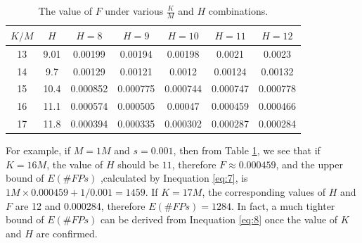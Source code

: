\documentclass[conference]{IEEEtran}
\begin{document}
\begin{table} 
	\centering
	\caption{The value of $F$ under various $\frac{K}{M}$ and $H$ combinations.}
   \begin{tabular}{|c|c|c|c|c|c|c|}
   	\hline
   	$K/M$ & $H$& $H=8$ & $H=9$ & $H=10$ & $H=11$ & $H=12$\\ 
   	\hline
   	13&9.01&0.00199&0.00194&0.00198&0.0021&0.0023\\
   	\hline
   	14&9.7&0.00129&0.00121&0.0012&0.00124&0.00132\\
   	\hline
   	15&10.4&0.000852&0.000775&0.000744&0.000747&0.000778\\
   	\hline
   	16&11.1&0.000574&0.000505&0.00047&0.000459&0.000466\\
   	\hline
   	17&11.8&0.000394&0.000335&0.000302&0.000287&0.000284\\
   	\hline
   \end{tabular}
    	\label{tab:2}
\end{table}
For example, if $M=1M$ and $s=0.001$, then from Table \ref{tab:2}, we see that if $K=16M$, the value of $H$ should be $11$, therefore $F\approx0.000459$, and the upper bound of $E(\#FPs)$ ,calculated by Inequation \ref{eq:7}, is $1M\times0.000459+1/0.001=1459$. If $K=17M$, the corresponding values of $H$ and $F$ are 12 and 0.000284, therefore $E(\#FPs)=1284$. In fact, a much tighter bound of $E(\#FPs)$ can be derived from Inequation \ref{eq:8} once the value of $K$ and $H$ are confirmed.\par
\end{document}
